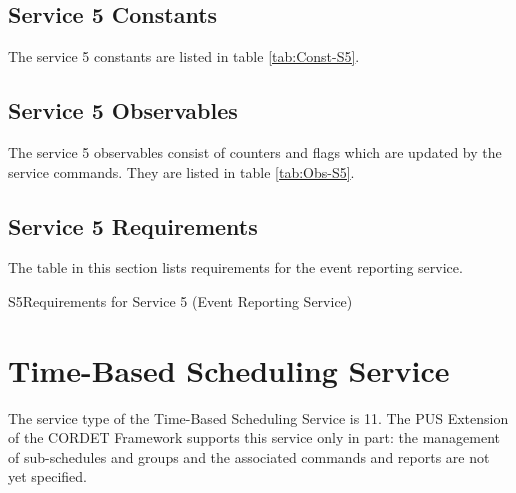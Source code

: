 \documentclass{pnp_article}
\begin{document}
\newpage
{}
\newpage
{}
\newpage
{}
\newpage
{}


\newpage
\subsection{Service 5 Constants}\label{sec:serv5Const}
The service 5 constants are listed in table \ref{tab:Const-S5}. 



\subsection{Service 5 Observables}\label{sec:serv5Obs}
The service 5 observables consist of counters and flags which are updated by the service commands. They are listed in table \ref{tab:Obs-S5}.



\newpage
\subsection{Service 5 Requirements}
The table in this section lists requirements for the event reporting service.

\begin{crReq}{S5}{Requirements for Service 5 (Event Reporting Service)}
\end{crReq}



\section{Time-Based Scheduling Service}\label{sec:serv11}
The service type of the Time-Based Scheduling Service is 11. The PUS Extension of the CORDET Framework supports this service only in part: the management of sub-schedules and groups and the associated commands and reports are not yet specified. 
\end{document}
